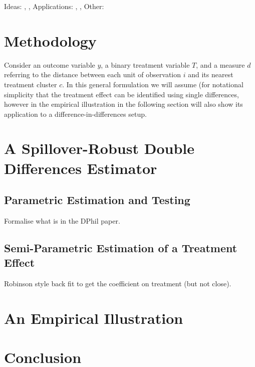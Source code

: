 \documentclass{article}
\begin{document}
Ideas: \citet{McIntosh2008}, \citet{Bairdetal2014}, \citet{AngelucciDiMaro2010} 
Applications: \citet{AngelucciDeGiorgi2009}, \citet{Heckmanetal1998}, 
\citet{MiguelKremer2004}
Other: \citet{Imbens2004}

\section{Methodology}
Consider an outcome variable $y$, a binary treatment variable $T$, and a measure 
$d$ referring to the distance between each unit of observation $i$ and its 
nearest treatment cluster $c$.  In this general formulation we will assume (for 
notational simplicity that the treatment effect can be identified using single
differences, however in the empirical illustration in the following section
will also show its application to a difference-in-differences setup.

\section{A Spillover-Robust Double Differences Estimator}
\subsection{Parametric Estimation and Testing}
Formalise what is in the DPhil paper.

\subsection{Semi-Parametric Estimation of a Treatment Effect}
Robinson style back fit to get the coefficient on treatment (but not close).

\section{An Empirical Illustration}
\section{Conclusion}


\end{document}
